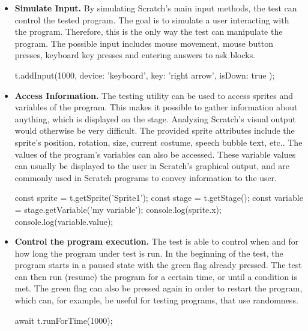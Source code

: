 \begin{itemize}
    \item \textbf{Simulate Input.}
        By simulating Scratch's main input methods, the test can control the tested program.
        The goal is to simulate a user interacting with the program.
        Therefore, this is the only way the test can manipulate the program.
        The possible input includes mouse movement, mouse button presses, keyboard key presses and entering answers to ask blocks.
        \begin{javascriptcode}
            t.addInput(1000, {
                device: 'keyboard',
                key: 'right arrow',
                isDown: true
            });
        \end{javascriptcode}
    \item \textbf{Access Information.}
        The testing utility can be used to access sprites and variables of the program.
        This makes it possible to gather information about anything, which is displayed on the stage.
        Analyzing Scratch's visual output would otherwise be very difficult.
        The provided sprite attributes include the sprite's position, rotation, size, current costume, speech bubble text, etc..
        The values of the program's variables can also be accessed.
        These variable values can usually be displayed to the user in Scratch's graphical output, and are commonly used in Scratch programs to convey information to the user.
        \begin{javascriptcode}
            const sprite = t.getSprite('Sprite1');
            const stage = t.getStage();
            const variable = stage.getVariable('my variable');
            console.log(sprite.x);
            console.log(variable.value);
        \end{javascriptcode}
    \item \textbf{Control the program execution.}
        The test is able to control when and for how long the program under test is run.
        In the beginning of the test, the program starts in a paused state with the green flag already pressed.
        The test can then run (resume) the program for a certain time, or until a condition is met.
        The green flag can also be pressed again in order to restart the program, which can, for example, be useful for testing programs, that use randomness.
        \begin{javascriptcode}
            await t.runForTime(1000);

\end{javascriptcode}
\end{itemize}
